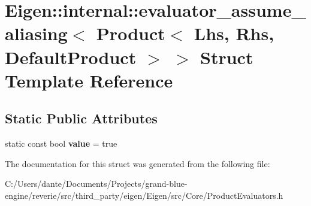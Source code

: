\hypertarget{struct_eigen_1_1internal_1_1evaluator__assume__aliasing_3_01_product_3_01_lhs_00_01_rhs_00_01_default_product_01_4_01_4}{}\section{Eigen\+::internal\+::evaluator\+\_\+assume\+\_\+aliasing$<$ Product$<$ Lhs, Rhs, Default\+Product $>$ $>$ Struct Template Reference}
\label{struct_eigen_1_1internal_1_1evaluator__assume__aliasing_3_01_product_3_01_lhs_00_01_rhs_00_01_default_product_01_4_01_4}
\subsection*{Static Public Attributes}
\begin{DoxyCompactItemize}
\item 
\mbox{\label{struct_eigen_1_1internal_1_1evaluator__assume__aliasing_3_01_product_3_01_lhs_00_01_rhs_00_01_default_product_01_4_01_4_ac5a29455c368170cb038f0b8beccb75a}} 
static const bool {\bfseries value} = true
\end{DoxyCompactItemize}


The documentation for this struct was generated from the following file\+:\begin{DoxyCompactItemize}
\item 
C\+:/\+Users/dante/\+Documents/\+Projects/grand-\/blue-\/engine/reverie/src/third\+\_\+party/eigen/\+Eigen/src/\+Core/Product\+Evaluators.\+h\end{DoxyCompactItemize}
